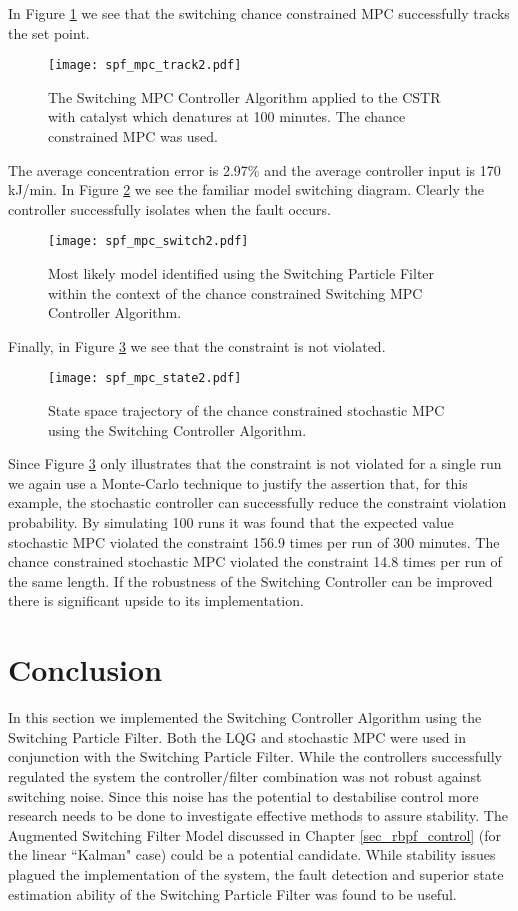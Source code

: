 In Figure \ref{fig_spf_mpc_track2} we see that the switching chance constrained MPC successfully tracks the set point.
\begin{figure}[H] 
\centering
\texttt{[image: spf\_mpc\_track2.pdf]}
\caption{The Switching MPC Controller Algorithm applied to the CSTR with catalyst which denatures at 100 minutes. The chance constrained MPC was used.}
\label{fig_spf_mpc_track2}
\end{figure}
The average concentration error is 2.97\% and the average controller input is 170 kJ/min. In Figure \ref{fig_spf_mpc_switch2} we see the familiar model switching diagram. Clearly the controller successfully isolates when the fault occurs.
\begin{figure}[H] 
\centering
\texttt{[image: spf\_mpc\_switch2.pdf]}
\caption{Most likely model identified using the Switching Particle Filter within the context of the chance constrained Switching MPC Controller Algorithm.}
\label{fig_spf_mpc_switch2}
\end{figure}
Finally, in Figure \ref{fig_spf_mpc_state2} we see that the constraint is not violated.
\begin{figure}[H] 
\centering
\texttt{[image: spf\_mpc\_state2.pdf]}
\caption{State space trajectory of the chance constrained stochastic MPC using the Switching Controller Algorithm.}
\label{fig_spf_mpc_state2}
\end{figure}
Since Figure \ref{fig_spf_mpc_state2} only illustrates that the constraint is not violated for a single run we again use a Monte-Carlo technique to justify the assertion that, for this example, the stochastic controller can successfully reduce the constraint violation probability. By simulating 100 runs it was found that the expected value stochastic MPC violated the constraint 156.9 times per run of 300 minutes. The chance constrained stochastic MPC violated the constraint 14.8 times per run of the same length. If the robustness of the Switching Controller can be improved there is significant upside to its implementation.

\section{Conclusion}
In this section we implemented the Switching Controller Algorithm using the Switching Particle Filter. Both the LQG and stochastic MPC were used in conjunction with the Switching Particle Filter. While the controllers successfully regulated the system the controller/filter combination was not robust against switching noise. Since this noise has the potential to destabilise control more research needs to be done to investigate effective methods to assure stability. The Augmented Switching Filter Model discussed in Chapter \ref{sec_rbpf_control} (for the linear ``Kalman" case) could be a potential candidate. While stability issues plagued the implementation of the system, the fault detection and superior state estimation ability of the Switching Particle Filter was found to be useful.